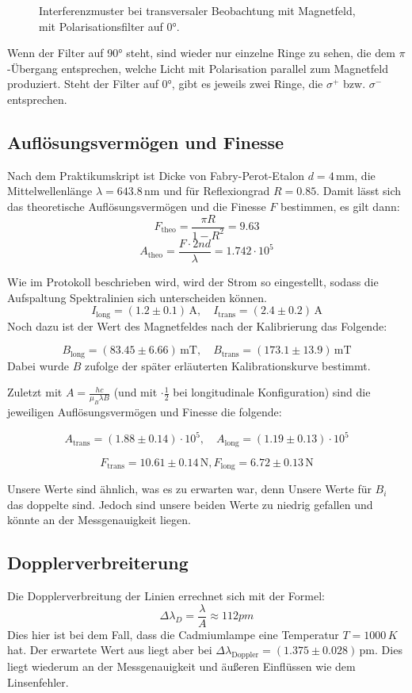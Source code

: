 \documentclass{article}
\begin{document}
\begin{multicols}{2}
\begin{figure}[H]
  \caption{Interferenzmuster bei transversaler Beobachtung mit Magnetfeld, mit Polarisationsfilter auf \ang{0}.}
  \label{fig:zeeman-transveral-mit-0}
\end{figure}
Wenn der Filter auf \ang{90} steht, sind wieder nur einzelne Ringe zu sehen, die dem $\pi$-Übergang entsprechen,
welche Licht mit Polarisation parallel zum Magnetfeld produziert.
Steht der Filter auf \ang{0}, gibt es jeweils zwei Ringe, die $\sigma^+$ bzw. $\sigma^-$ entsprechen.

\subsection{Auflösungsvermögen und Finesse}

Nach dem Praktikumskript ist Dicke von Fabry-Perot-Etalon 
$d = 4 \, \text{mm}$, die Mittelwellenlänge $\lambda = 643.8 \, \text{nm}$ und 
für Reflexiongrad $R=0.85$.
Damit lässt sich das theoretische Auflösungsvermögen und die Finesse $F$ 
bestimmen, es gilt dann:
\[
F_{\text{theo}} = \frac{\pi R}{1 - R^2}= 9.63
\]
\[
  A_{\text{theo}} = \frac{F \cdot 2nd}{\lambda} = 1.742 \cdot 10^5
\]

Wie im Protokoll beschrieben wird, wird der Strom so eingestellt, sodass die Aufspaltung
Spektralinien sich unterscheiden können.
\[
I_{\text{long}} = (1.2 \pm 0.1) \, \text{A}, \quad I_{\text{trans}} = (2.4 \pm 0.2) \, \text{A}
\]
Noch dazu ist der Wert des Magnetfeldes nach der Kalibrierung das Folgende: 

\[
B_{\text{long}} = ( 83.45 \pm 6.66) \, \text{mT}, \quad B_{\text{trans}} = (173.1 \pm 13.9) \, \text{mT}
\]
Dabei wurde $B$ zufolge der später erläuterten Kalibrationskurve bestimmt.

Zuletzt mit $A=\frac{hc}{\mu_B \lambda B}$ (und mit $\cdot \frac{1}{2}$ bei longitudinale 
Konfiguration) sind die jeweiligen Auflösungsvermögen und Finesse die folgende:

\[
A_{\text{trans}} = (1.88 \pm 0.14) \cdot 10^5, \quad A_{\text{long}} = (1.19 \pm 0.13) \cdot 10^5
\]

\[
  F_{\text{trans}} = 10.61 \pm 0.14 \, \text{N}, F_{\text{long}} = 6.72 \pm 0.13 \, \text{N}
\]

Unsere Werte sind ähnlich, was es zu erwarten war, denn Unsere Werte für 
$B_i$ das doppelte sind. Jedoch sind unsere beiden Werte zu niedrig gefallen und 
könnte an der Messgenauigkeit liegen. 

\subsection{Dopplerverbreiterung}
Die Dopplerverbreitung der Linien errechnet sich mit der Formel:
\begin{equation*}
  \Delta \lambda_D = \frac{\lambda}{A} \approx 112 pm
\end{equation*}
Dies hier ist bei dem Fall, dass die Cadmiumlampe eine Temperatur 
\( T=1000\,K \) hat. Der erwartete Wert aus \cite{einheit}liegt aber bei \( \Delta \lambda_{\text{Doppler}}
 = (1.375 \pm 0.028) \, \text{pm} \). Dies liegt wiederum an der Messgenauigkeit und 
 äußeren Einflüssen wie dem Linsenfehler.



\end{multicols}
\end{document}
